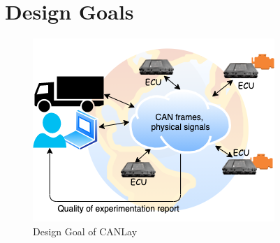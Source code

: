 \documentclass[letterpaper,twocolumn,12pt]{article}
\begin{document}
\section{Design Goals}
\begin{figure}[t!]
    \centering
    \includegraphics[width=\linewidth]{images/design_goal.drawio.png}
    \caption{Design Goal of CANLay}
    \label{fig:goal}
\end{figure}

\end{document}
